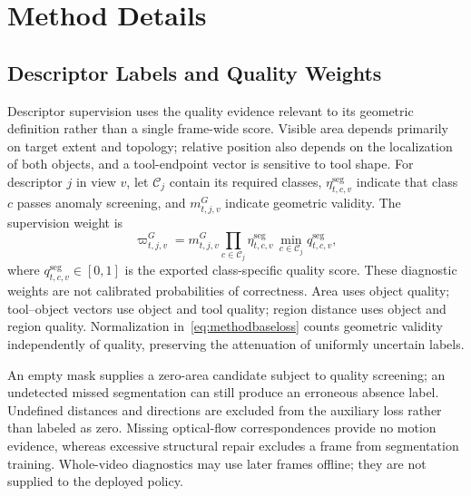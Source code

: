 \section{Method Details}
\label{app:methoddetails}

\subsection{Descriptor Labels and Quality Weights}
\label{app:seguncertainty}
\label{app:visibilityextension}
Descriptor supervision uses the quality evidence relevant to its geometric definition rather than a single frame-wide score.
Visible area depends primarily on target extent and topology; relative position also depends on the localization of both objects, and a tool-endpoint vector is sensitive to tool shape.
For descriptor $j$ in view $v$, let $\mathcal C_j$ contain its required classes, $\eta_{t,c,v}^{\mathrm{seg}}$ indicate that class $c$ passes anomaly screening, and $m_{t,j,v}^{G}$ indicate geometric validity.
The supervision weight is
\begin{equation}
 \varpi_{t,j,v}^{G}
 =m_{t,j,v}^{G}
  \prod_{c\in\mathcal C_j}\eta_{t,c,v}^{\mathrm{seg}}\,
  \min_{c\in\mathcal C_j}q_{t,c,v}^{\mathrm{seg}},
 \label{eq:relationadmission}
\end{equation}
where $q_{t,c,v}^{\mathrm{seg}}\in[0,1]$ is the exported class-specific quality score.
These diagnostic weights are not calibrated probabilities of correctness.
Area uses object quality; tool--object vectors use object and tool quality; region distance uses object and region quality.
Normalization in~\eqref{eq:methodbaseloss} counts geometric validity independently of quality, preserving the attenuation of uniformly uncertain labels.

An empty mask supplies a zero-area candidate subject to quality screening; an undetected missed segmentation can still produce an erroneous absence label.
Undefined distances and directions are excluded from the auxiliary loss rather than labeled as zero.
Missing optical-flow correspondences provide no motion evidence, whereas excessive structural repair excludes a frame from segmentation training.
Whole-video diagnostics may use later frames offline; they are not supplied to the deployed policy.

